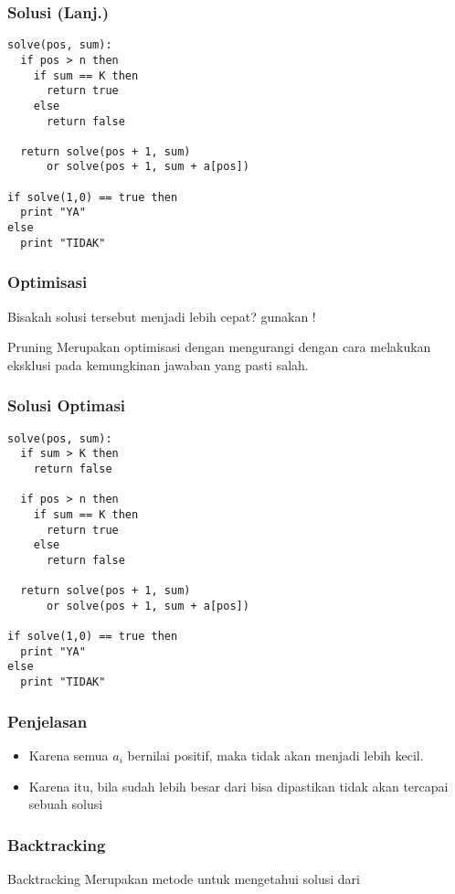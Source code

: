 \begin{frame}[fragile]
\frametitle{Solusi (Lanj.)}
\begin{lstlisting}
solve(pos, sum):
  if pos > n then
    if sum == K then
      return true
    else
      return false

  return solve(pos + 1, sum) 
      or solve(pos + 1, sum + a[pos])

if solve(1,0) == true then
  print "YA"
else
  print "TIDAK"
\end{lstlisting}
\end{frame}

\begin{frame}
\frametitle{Optimisasi}
Bisakah solusi tersebut menjadi lebih cepat?
gunakan !

\begin{block}{Pruning}
  Merupakan optimisasi dengan mengurangi  dengan cara melakukan eksklusi pada kemungkinan jawaban yang pasti salah.
\end{block}
\end{frame}

\begin{frame}[fragile]
\frametitle{Solusi Optimasi}
\begin{lstlisting}
solve(pos, sum):
  if sum > K then
    return false

  if pos > n then
    if sum == K then
      return true
    else
      return false

  return solve(pos + 1, sum) 
      or solve(pos + 1, sum + a[pos])

if solve(1,0) == true then
  print "YA"
else
  print "TIDAK"
\end{lstlisting}
\end{frame}

\begin{frame}
\frametitle{Penjelasan}
\begin{itemize}
  \item Karena semua $a_i$ bernilai positif, maka  tidak akan menjadi lebih kecil.
  \item Karena itu, bila  sudah lebih besar dari  bisa dipastikan tidak akan tercapai sebuah solusi
\end{itemize}
\end{frame}

\begin{frame}
\frametitle{Backtracking}
  \begin{block}{Backtracking}
    Merupakan metode untuk mengetahui solusi dari 
  \end{block}
\end{frame}

